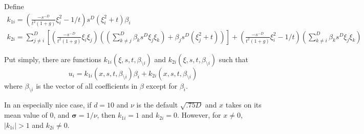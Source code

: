     Define 
    \begin{gather*}
        k_{1i} = \left(\frac{-s^{-D}}{t^2(1+g)}\xi_i^2 - 1/t\right) s^D (\xi_i^2 + t) \beta_i \\
        k_{2i} = \sum_{j\neq i}^D \left[\left(\frac{-s^{-D}}{t^2(1+g)}\xi_i \xi_j\right)\left(\left(\sum_{k\neq j}^D\beta_ks^D \xi_j \xi_k \right) + \beta_j s^D (\xi_j^2 + t)\right)\right] + \left(\frac{-s^{-D}}{t^2(1+g)}\xi_i^2 - 1/t\right) \left(\sum_{k\neq i}^D\beta_k s^D \xi_j \xi_k \right)
    \end{gather*}

    Put simply, there are functions $k_{1i}(\xi,s,t,\beta_{\setminus i})$ and $k_{2i}(\xi,s,t,\beta_{\setminus i})$ such that 
    \begin{equation*}
        u_i = k_{1i}(x,s,t,\beta_{\setminus i}) \beta_i + k_{2i}(x,s,t,\beta_{\setminus i})
    \end{equation*}
    where $\beta_{\setminus i}$ is the vector of all coefficients in $\beta$ except for $\beta_i$. \qedsymbol

    In an especially nice case, if $d=10$ and $\nu$ is the default $\sqrt{.75D}$ and $x$ takes on its mean value of $0$, and $\mathbf{\sigma} = 1/\nu$, then $k_{1i} = 1$ and $k_{2i} = 0$. However, for $x \neq 0$, $\mid k_{1i}\mid  > 1$ and $k_{2i}\neq 0$. 

    
